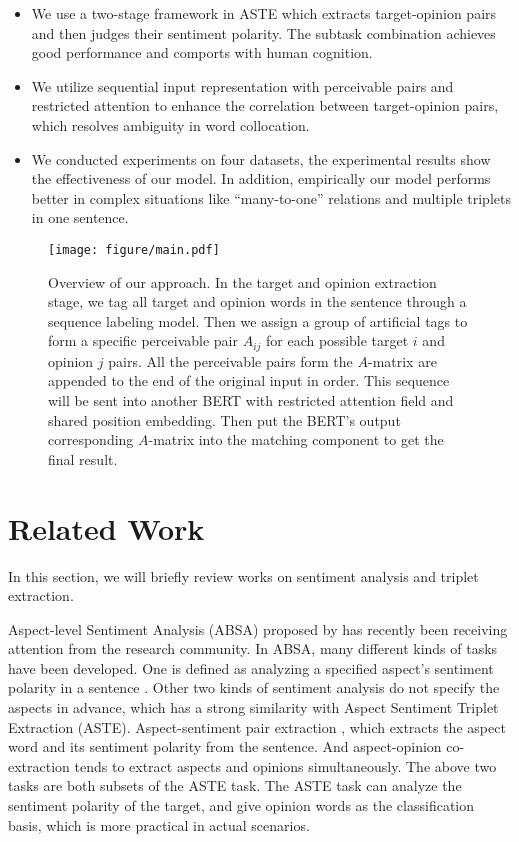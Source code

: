 \documentclass[11pt]{article}
\begin{document}
\begin{itemize}
    \item We use a two-stage framework in ASTE which extracts target-opinion pairs and then judges their sentiment polarity. The subtask combination achieves good performance and comports with human cognition.
    \item We utilize sequential input representation with perceivable pairs and restricted attention to enhance the correlation between target-opinion pairs, which resolves ambiguity in word collocation.
    \item We conducted experiments on four datasets, the experimental results show the effectiveness of our model. In addition, empirically our model performs better in complex situations like ``many-to-one'' relations and multiple triplets in one sentence.
\end{itemize} \begin{figure*}[t]
    \centering
    \texttt{[image: figure/main.pdf]}
    \caption{Overview of our approach. In the target and opinion extraction stage, we tag all target and opinion words in the sentence through a sequence labeling model. Then we assign a group of artificial tags to form a specific perceivable pair $A_{ij}$ for each possible target $i$ and opinion $j$ pairs. All the perceivable pairs form the $A$-matrix are appended to the end of the original input in order. This sequence will be sent into another BERT with restricted attention field and shared position embedding. Then put the BERT's output corresponding $A$-matrix into the matching component to get the final result. }
    \label{fig:main}
\end{figure*}


 \section{Related Work}
In this section, we will briefly review works on sentiment analysis and triplet extraction.

Aspect-level Sentiment Analysis (ABSA) proposed by \cite{sentiment2014} has recently been receiving attention from the research community. 
In ABSA, many different kinds of tasks have been developed.
One is defined as analyzing a specified aspect's sentiment polarity in a sentence \cite{dong2014adaptive,ma2017interactive,tang2020dependency}. 
Other two kinds of sentiment analysis do not specify the aspects in advance, 
which has a strong similarity with Aspect Sentiment Triplet Extraction (ASTE). Aspect-sentiment pair extraction \cite{li2019unified}, which extracts the aspect word and its sentiment polarity from the sentence. And aspect-opinion co-extraction \cite{li2018aspect} tends to extract aspects and opinions simultaneously. The above two tasks are both subsets of the ASTE task. The ASTE task can analyze the sentiment polarity of the target, and give opinion words as the classification basis, which is more practical in actual scenarios.
\end{document}
